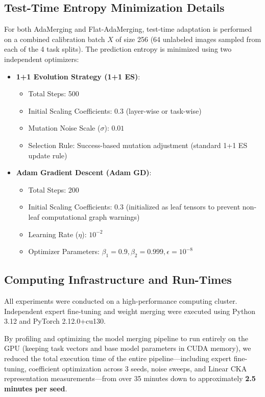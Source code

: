 \documentclass{article}
\theoremstyle{plain}
\theoremstyle{definition}
\theoremstyle{remark}
\begin{document}
\subsection{Test-Time Entropy Minimization Details}
For both AdaMerging and Flat-AdaMerging, test-time adaptation is performed on a combined calibration batch $X$ of size 256 (64 unlabeled images sampled from each of the 4 task splits). The prediction entropy is minimized using two independent optimizers:
\begin{itemize}
    \item \textbf{1+1 Evolution Strategy (1+1 ES)}:
    \begin{itemize}
        \item Total Steps: 500
        \item Initial Scaling Coefficients: $0.3$ (layer-wise or task-wise)
        \item Mutation Noise Scale ($\sigma$): $0.01$
        \item Selection Rule: Success-based mutation adjustment (standard 1+1 ES update rule)
    \end{itemize}
    \item \textbf{Adam Gradient Descent (Adam GD)}:
    \begin{itemize}
        \item Total Steps: 200
        \item Initial Scaling Coefficients: $0.3$ (initialized as leaf tensors to prevent non-leaf computational graph warnings)
        \item Learning Rate ($\eta$): $10^{-2}$
        \item Optimizer Parameters: $\beta_1 = 0.9, \beta_2 = 0.999, \epsilon = 10^{-8}$
    \end{itemize}
\end{itemize}

\subsection{Computing Infrastructure and Run-Times}
All experiments were conducted on a high-performance computing cluster. Independent expert fine-tuning and weight merging were executed using Python 3.12 and PyTorch 2.12.0+cu130. 

By profiling and optimizing the model merging pipeline to run entirely on the GPU (keeping task vectors and base model parameters in CUDA memory), we reduced the total execution time of the entire pipeline---including expert fine-tuning, coefficient optimization across 3 seeds, noise sweeps, and Linear CKA representation measurements---from over 35 minutes down to approximately \textbf{2.5 minutes per seed}.
\end{document}
